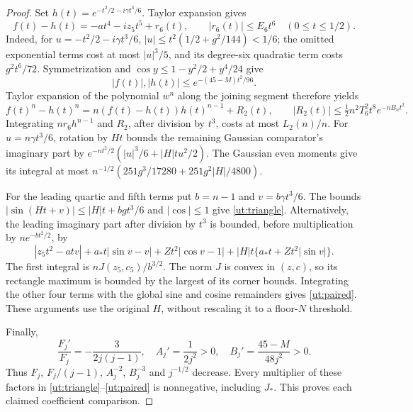 \documentclass[aop,preprint]{imsart}
\theoremstyle{definition}
\numberwithin{equation}{section}
\begin{document}
\begin{proof}
Set $h(t)=e^{-t^2/2-i\gamma t^3/6}$. Taylor expansion gives
\[
 f(t)-h(t)=-at^4-iz_5t^5+r_6(t),\qquad
 |r_6(t)|\le E_6t^6\quad(0\le t\le1/2).
\]
Indeed, for $u=-t^2/2-i\gamma t^3/6$,
$|u|\le t^2(1/2+g^2/144)<1/6$;
the omitted exponential terms cost at most $|u|^3/5$, and its
degree-six quadratic term costs $g^2t^6/72$.
Symmetrization and $\cos y\le1-y^2/2+y^4/24$ give
\[
 |f(t)|,|h(t)|\le e^{-(45-M)t^2/96}.
\]
Taylor expansion of the polynomial $w^n$ along the joining segment
therefore yields
\[
 f(t)^n-h(t)^n=n(f(t)-h(t))h(t)^{n-1}+R_2(t),\qquad
 |R_2(t)|\le\tfrac12n^2T_6^2t^8e^{-nB_nt^2}.
\]
Integrating $nr_6h^{n-1}$ and $R_2$, after division by $t^3$,
costs at most $L_2(n)/n$.
For $u=n\gamma t^3/6$, rotation by $Ht$ bounds the remaining
Gaussian comparator's imaginary part by
$e^{-nt^2/2}(|u|^3/6+|H|t u^2/2)$.
The Gaussian even moments give its integral at most
$n^{-1/2}(251g^3/17280+251g^2|H|/4800)$.

For the leading quartic and fifth terms put $b=n-1$ and
$v=b\gamma t^3/6$. The bounds
$|\sin(Ht+v)|\le|H|t+bg t^3/6$ and $|\cos|\le1$
give \eqref{ut:triangle}.
Alternatively, the leading imaginary part after division by $t^3$
is bounded, before multiplication by $ne^{-bt^2/2}$, by
\[
 |z_5t^2-atv|+a_*t|\sin v-v|+Zt^2|\cos v-1|
                 +|H|t\{a_*t+Zt^2|\sin v|\}.
\]
The first integral is $nJ(z_5,c_5)/b^{3/2}$.
The norm $J$ is convex in $(z,c)$, so its rectangle maximum is
bounded by the largest of its corner bounds. Integrating the other
four terms with the global sine and cosine remainders gives
\eqref{ut:paired}. These arguments use the original $H$, without
rescaling it to a floor-$N$ threshold.

Finally,
\[
 \frac{F_j'}{F_j}=-\frac3{2j(j-1)},\quad
 A_j'=\frac1{2j^2}>0,\quad B_j'=\frac{45-M}{48j^2}>0.
\]
Thus $F_j$, $F_j/(j-1)$, $A_j^{-2}$, $B_j^{-3}$ and
$j^{-1/2}$ decrease. Every multiplier of these factors in
\eqref{ut:triangle}--\eqref{ut:paired} is nonnegative, including
$J_*$. This proves each claimed coefficient comparison.
\end{proof}
\end{document}
